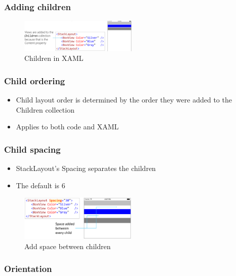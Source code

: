 \documentclass{article}
\begin{document}
\subsubsection{Adding children}

\begin{figure}[H]
    \centering
    \includegraphics[width=0.5\textwidth]{xaml-stacklayout-children.png}
    \caption{Children in XAML}
\end{figure}

\subsubsection{Child ordering}

\begin{itemize}
    \item Child layout order is determined by the order they were added to the Children collection
    \item Applies to both code and XAML
\end{itemize}

\subsubsection{Child spacing}

\begin{itemize}
    \item StackLayout's Spacing separates the children
    \item The default is 6
\end{itemize}

\begin{figure}[H]
    \centering
    \includegraphics[width=0.5\textwidth]{xaml-stacklayout-spacing.png}
    \caption{Add space between children}
\end{figure}

\subsubsection{Orientation}
\end{document}
